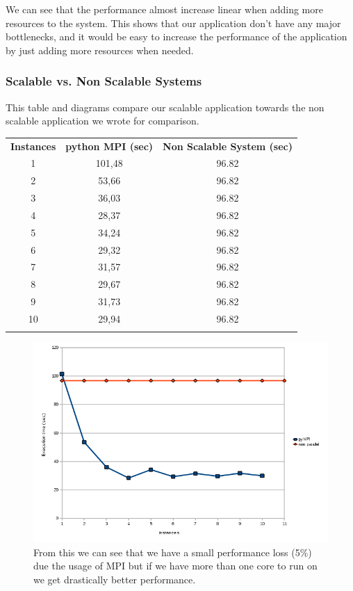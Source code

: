 \documentclass{article}
\begin{document}
We can see that the performance almost increase linear when adding more
resources to the system. This shows that our application don't have any
major bottlenecks, and it would be easy to increase the performance
of the application by just adding more resources when needed.

\subsubsection{Scalable vs. Non Scalable Systems}
This table and diagrams compare our scalable application towards the non
scalable application we wrote for comparison.

\begin{table}[H]
\begin{tabular}{c c c}
  \rowcolor[gray]{0.5}
  {\bf Instances} & {\bf python MPI (sec)} & {\bf Non Scalable System (sec)} \\
  1 & 101,48 & 96.82 \\
  2 & 53,66  & 96.82  \\
  3 & 36,03  & 96.82  \\
  4 & 28,37  & 96.82  \\
  5 & 34,24  & 96.82  \\
  6 & 29,32  & 96.82  \\
  7 & 31,57  & 96.82  \\
  8 & 29,67  & 96.82  \\
  9 & 31,73  & 96.82  \\
 10 & 29,94  & 96.82  \\
\rowcolor[gray]{0.5}
\end{tabular}
\end{table}
\begin{figure}[H]
\includegraphics[width=\textwidth]{img/parallel-vs-non-parallel.png}
\center
\caption{From this we can see that we have a small performance loss (5\%) due the usage
of MPI but if we have more than one core to run on we get drastically better
performance.}
\end{figure}
\end{document}
